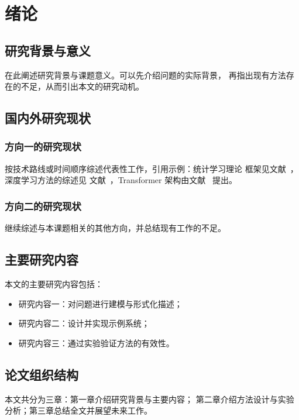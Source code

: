 \chapter{绪\quad 论}

\section{研究背景与意义}
在此阐述研究背景与课题意义。可以先介绍问题的实际背景，
再指出现有方法存在的不足，从而引出本文的研究动机。

\section{国内外研究现状}
\subsection{方向一的研究现状}
按技术路线或时间顺序综述代表性工作，引用示例：统计学习理论
框架见文献~\cite{vapnik2000}，深度学习方法的综述见
文献~\cite{lecun2015}，Transformer 架构由文献~\cite{vaswani2017} 提出。

\subsection{方向二的研究现状}
继续综述与本课题相关的其他方向，并总结现有工作的不足。

\section{主要研究内容}
本文的主要研究内容包括：
\begin{itemize}
  \item 研究内容一：对问题进行建模与形式化描述；
  \item 研究内容二：设计并实现示例系统；
  \item 研究内容三：通过实验验证方法的有效性。
\end{itemize}

\section{论文组织结构}
本文共分为三章：第一章介绍研究背景与主要内容；
第二章介绍方法设计与实验分析；第三章总结全文并展望未来工作。
